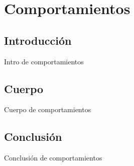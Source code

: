 \section{Comportamientos}

\subsection{Introducci\'on}
Intro de comportamientos

\subsection{Cuerpo}
Cuerpo de comportamientos

\subsection{Conclusi\'on}
Conclusi\'on de comportamientos

